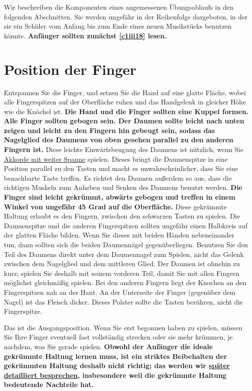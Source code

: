 Wir beschreiben die Komponenten eines angemessenen Übungsablaufs in den folgenden Abschnitten.
Sie werden ungefähr in der Reihenfolge dargeboten, in der sie ein Schüler vom Anfang bis zum Ende eines neuen Musikstücks benutzen könnte.
\textbf{Anfänger sollten zunächst \hyperref[c1iii18]{\ref*{c1iii18}} lesen.}


\section{Position der Finger}
\label{c1ii2}

Entspannen Sie die Finger, und setzen Sie die Hand auf eine glatte Fläche, wobei alle Fingerspitzen auf der Oberfläche ruhen und das Handgelenk in gleicher Höhe wie die Knöchel ist.
\textbf{Die Hand und die Finger sollten eine Kuppel formen.
Alle Finger sollten gebogen sein.
Der Daumen sollte leicht nach unten zeigen und leicht zu den Fingern hin gebeugt sein, sodass das Nagelglied des Daumens von oben gesehen parallel zu den anderen Fingern ist.}
Diese leichte Einwärtsbeugung des Daumens ist nützlich, wenn Sie \hyperref[c1iii7e]{Akkorde mit weiter Spanne} spielen.
Dieses bringt die Daumenspitze in eine Position parallel zu den Tasten und macht es unwahrscheinlicher, dass Sie eine benachbarte Taste treffen.
Es richtet den Daumen außerdem so aus, dass die richtigen Muskeln zum Anheben und Senken des Daumens benutzt werden.
\textbf{Die Finger sind leicht gekrümmt, abwärts gebogen und treffen in einem Winkel von ungefähr 45 Grad auf die Oberfläche.}
Diese gekrümmte Haltung erlaubt es den Fingern, zwischen den schwarzen Tasten zu spielen.
Die Daumenspitze und die anderen Fingerspitzen sollten ungefähr einen Halbkreis auf der glatten Fläche bilden.
Wenn Sie dieses mit beiden Händen nebeneinander tun, dann sollten sich die beiden Daumennägel gegenüberliegen.
Benutzen Sie den Teil des Daumens direkt unter dem Daumennagel zum Spielen, nicht das Gelenk zwischen dem Nagelglied und dem mittleren Glied.
Der Daumen ist ohnehin zu kurz; spielen Sie deshalb mit seinem vorderen Teil, damit Sie mit allen Fingern möglichst gleichmäßig spielen.
Bei den anderen Fingern liegt der Knochen an den Fingerspitzen nah an der Haut.
An der Unterseite der Finger (gegenüber dem Nagel) ist das Fleisch dicker.
Dieses Polster sollte die Tasten berühren, nicht die Fingerspitze.

Das ist die Ausgangsposition.
Wenn Sie erst begonnen haben zu spielen, müssen Sie Ihre Finger eventuell fast vollständig strecken oder sie mehr krümmen, je nachdem, was Sie gerade spielen.
\textbf{Obwohl der Anfänger die ideale gekrümmte Haltung lernen muss, ist ein striktes Beibehalten der gekrümmten Haltung deshalb nicht richtig; das werden wir \hyperref[c1iii4b]{später detailliert besprechen}, insbesondere weil die gekrümmte Haltung bedeutende Nachteile hat.}


